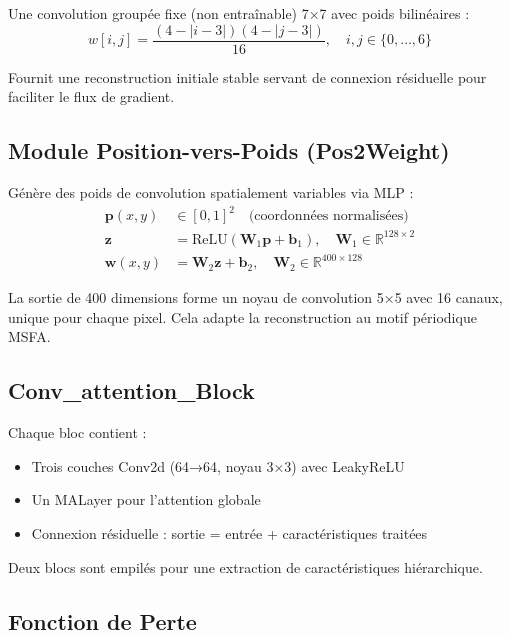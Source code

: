 \documentclass[conference]{IEEEtran}
\begin{document}
Une convolution groupée fixe (non entraînable) 7×7 avec poids bilinéaires :
\begin{equation}
w[i,j] = \frac{(4-|i-3|)(4-|j-3|)}{16}, \quad i,j \in \{0,\ldots,6\}
\end{equation}

Fournit une reconstruction initiale stable servant de connexion résiduelle pour faciliter le flux de gradient.

\subsection{Module Position-vers-Poids (Pos2Weight)}

Génère des poids de convolution spatialement variables via MLP :
\begin{equation}
\begin{aligned}
\mathbf{p}(x,y) &\in [0,1]^2 \quad \text{(coordonnées normalisées)} \\
\mathbf{z} &= \text{ReLU}(\mathbf{W}_1 \mathbf{p} + \mathbf{b}_1), \quad \mathbf{W}_1 \in \mathbb{R}^{128 \times 2} \\
\mathbf{w}(x,y) &= \mathbf{W}_2 \mathbf{z} + \mathbf{b}_2, \quad \mathbf{W}_2 \in \mathbb{R}^{400 \times 128}
\end{aligned}
\end{equation}

La sortie de 400 dimensions forme un noyau de convolution 5×5 avec 16 canaux, unique pour chaque pixel. Cela adapte la reconstruction au motif périodique MSFA.

\subsection{Conv\_attention\_Block}

Chaque bloc contient :
\begin{itemize}
    \item Trois couches Conv2d (64→64, noyau 3×3) avec LeakyReLU
    \item Un MALayer pour l'attention globale
    \item Connexion résiduelle : sortie = entrée + caractéristiques traitées
\end{itemize}

Deux blocs sont empilés pour une extraction de caractéristiques hiérarchique.

\subsection{Fonction de Perte}
\end{document}
